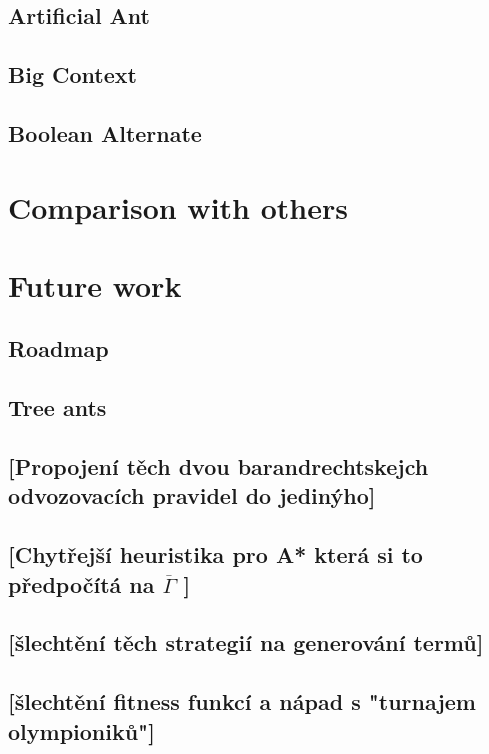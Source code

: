 \documentclass[12pt,a4paper]{report}
\begin{document}
\section{Artificial Ant}


\section{Big Context}

\section{Boolean Alternate}
		
\chapter{Comparison with others}

\chapter{Future work}

\section{Roadmap}
\section{Tree ants}
\section{[Propojení těch dvou barandrechtskejch odvozovacích pravidel do jedinýho]}
\section{[Chytřejší heuristika pro A* která si to předpočítá na $\overline{\Gamma}$ ]}
\section{[šlechtění těch strategií na generování termů]}
\section{[šlechtění fitness funkcí a nápad s "turnajem olympioniků"]}
\end{document}
